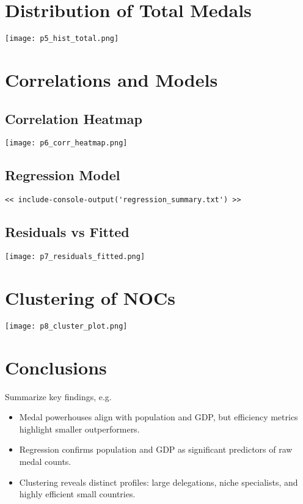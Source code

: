 \documentclass[11pt]{article}
\begin{document}
\section{Distribution of Total Medals}
\begin{center}
  \texttt{[image: p5\_hist\_total.png]}
\end{center}

\section{Correlations and Models}
\subsection{Correlation Heatmap}
\begin{center}
  \texttt{[image: p6\_corr\_heatmap.png]}
\end{center}

\subsection{Regression Model}
\begin{verbatim}
<< include-console-output('regression_summary.txt') >>
\end{verbatim}

\subsection{Residuals vs Fitted}
\begin{center}
  \texttt{[image: p7\_residuals\_fitted.png]}
\end{center}

\section{Clustering of NOCs}
\begin{center}
  \texttt{[image: p8\_cluster\_plot.png]}
\end{center}

\section{Conclusions}
Summarize key findings, e.g.\  
\begin{itemize}
  \item Medal powerhouses align with population and GDP, but efficiency metrics highlight smaller outperformers.  
  \item Regression confirms population and GDP as significant predictors of raw medal counts.  
  \item Clustering reveals distinct profiles: large delegations, niche specialists, and highly efficient small countries.
\end{itemize}
\end{document}
